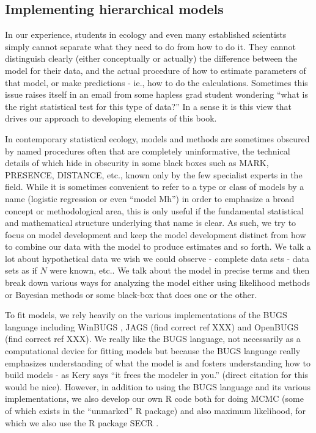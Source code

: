 \subsection{Implementing hierarchical models}

In our experience, students in ecology and even many established
scientists simply cannot separate what they need to do from how to do
it.  They cannot distinguish clearly (either conceptually or actually)
the difference between the model for their data, and the actual
procedure of how to estimate parameters of that model, or make
predictions - ie., how to do the calculations. Sometimes this issue
raises itself in an email from some hapless grad student wondering
``what is the right statistical test for this type of data?''  In a
sense it is this view that drives our approach to developing elements
of this book.

In contemporary statistical ecology, models and methods are sometimes
obscured by named procedures often that are completely uninformative,
the technical details of which hide in obscurity in some black boxes
such as MARK, PRESENCE, DISTANCE, etc., known only by the few
specialist experts in the field. While it is sometimes convenient to
refer to a type or class of models by a name (logistic regression or
even ``model Mh'') in order to emphasize a broad concept or
methodological area, this is only useful if the fundamental
statistical and mathematical structure underlying that name is
clear. As such, we try to focus on model development and keep the
model development distinct from how to combine our data with the model
to produce estimates and so forth. We talk a lot about hypothetical
data we wish we could observe - complete data sets - data sets as if
$N$ were known, etc.. We talk about the model in precise terms and
then break down various ways for analyzing the model either using
likelihood methods or Bayesian methods or some black-box that does one
or the other.

To fit models, we rely heavily on the various implementations of the
BUGS language including WinBUGS \citep{lunn_etal:2000}, JAGS (find
correct ref XXX) and OpenBUGS (find correct ref XXX). We really like
the BUGS language, not necessarily as a computational device for
fitting models but because the BUGS language really emphasizes
understanding of what the model is and fosters understanding how to
build models - as Kery says ``it frees the modeler in you.''  (direct
citation for this would be nice).  However, in addition to using the
BUGS language and its various implementations, we also develop our own
R code both for doing MCMC (some of which exists in the ``unmarked'' R
package) and also maximum likelihood, for which we also use the R
package SECR \citep{efford:2011}.


